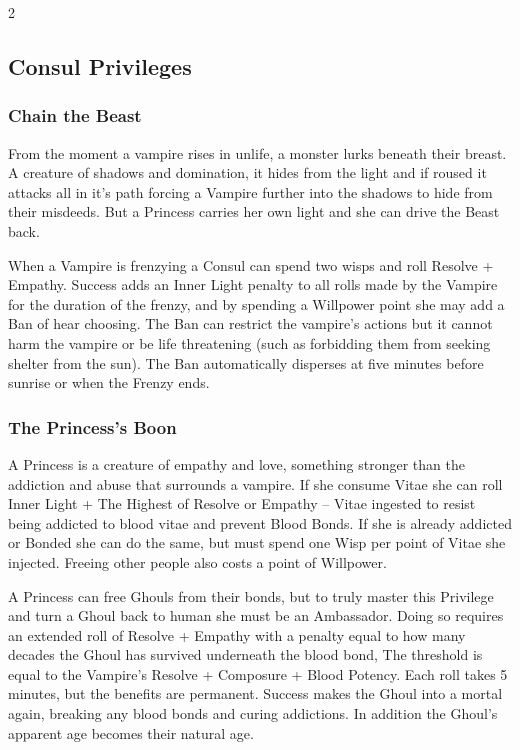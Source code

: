 \begin{multicols}{2}
\subsection*{Consul Privileges}
\subsubsection*{Chain the Beast} From the moment a vampire rises in unlife, a monster lurks beneath their breast. A creature of shadows and domination, it hides from the light and if roused it attacks all in it's path forcing a Vampire further into the shadows to hide from their misdeeds. But a Princess carries her own light and she can drive the Beast back. 

When a Vampire is frenzying a Consul can spend two wisps and roll Resolve + Empathy. Success adds an Inner Light penalty to all rolls made by the Vampire for the duration of the frenzy, and by spending a Willpower point she may add a Ban of hear choosing. The Ban can restrict the vampire’s actions but it cannot harm the vampire or be life threatening (such as forbidding them from seeking shelter from the sun). The Ban automatically disperses at five minutes before sunrise or when the Frenzy ends.

\subsubsection*{The Princess’s Boon} A Princess is a creature of empathy and love, something stronger than the addiction and abuse that surrounds a vampire. If she consume Vitae she can roll Inner Light + The Highest of Resolve or Empathy – Vitae ingested to resist being addicted to blood vitae and prevent Blood Bonds. If she is already addicted or Bonded she can do the same, but must spend one Wisp per point of Vitae she injected. Freeing other people also costs a point of Willpower. 

A Princess can free Ghouls from their bonds, but to truly master this Privilege and turn a Ghoul back to human she must be an Ambassador. Doing so requires an extended roll of Resolve + Empathy with a penalty equal to how many decades the Ghoul has survived underneath the blood bond, The threshold is equal to the Vampire’s Resolve + Composure + Blood Potency. Each roll takes 5 minutes, but the benefits are permanent. Success makes the Ghoul into a mortal again, breaking any blood bonds and curing addictions. In addition the Ghoul's apparent age becomes their natural age.


\end{multicols}
